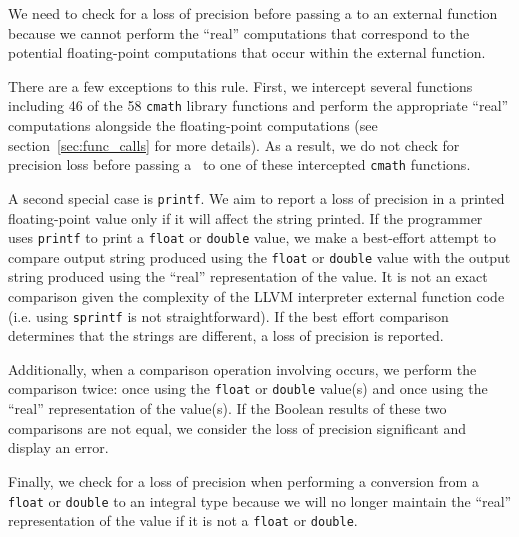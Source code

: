 We need to check for a loss of precision before passing a \smartfloat\allowbreak to an external function because we cannot perform the ``real'' computations that correspond to the potential floating-point computations that occur within the external function.

There are a few exceptions to this rule. First, we intercept several functions including 46 of the 58 \texttt{cmath} library functions and perform the appropriate ``real'' computations alongside the floating-point computations (see section~\ref{sec:func_calls} for more details). As a result, we do not check for precision loss before passing a \smartfloat~to one of these intercepted \texttt{cmath} functions.

A second special case is \texttt{printf}. We aim to report a loss of precision in a printed floating-point value only if it will affect the string printed. If the programmer uses \texttt{printf} to print a \texttt{float} or \texttt{double} value, we make a best-effort attempt to compare output string produced using the \texttt{float} or \texttt{double} value with the output string produced using the ``real'' representation of the value. It is not an exact comparison given the complexity of the LLVM interpreter external function code (i.e. using \texttt{sprintf} is not straightforward). If the best effort comparison determines that the strings are different, a loss of precision is reported.

Additionally, when a comparison operation involving \smartfloat\allowbreak occurs, we perform the comparison twice: once using the \texttt{float} or \texttt{double} value(s) and once using the ``real'' representation of the value(s). If the Boolean results of these two comparisons are not equal, we consider the loss of precision significant and display an error.

Finally, we check for a loss of precision when performing a conversion from a \texttt{float} or \texttt{double} to an integral type because we will no longer maintain the ``real'' representation of the value if it is not a \texttt{float} or \texttt{double}.
